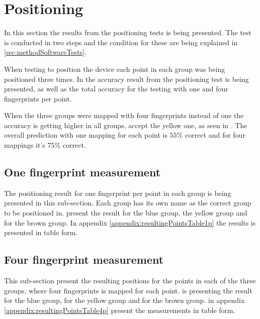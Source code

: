 \section{Positioning}\label{sec:resultPos}
In this section the results from the positioning tests is being presented.
The test is conducted in two steps and the condition for these are being explained in \cref{sec:methodSoftwareTests}.

\bigskip

When testing to position the device each point in each group was being positioned three times.
In  the accuracy result from the positioning test is being presented, as well as the total accuracy for the testing with one and four fingerprints per point.


When the three groups were mapped with four fingerprints instead of one the accuracy is getting higher in all groups, accept the yellow one, as seen in .
The overall prediction with one mapping for each point is $55\%$ correct and for four mappings it's $75\%$ correct.


\subsection{One fingerprint measurement}\label{sec:resultsPosOneFingerprint}
The positioning result for one fingerprint per point in each group is being presented in this sub-section.
Each group has its own name as the correct group to be positioned in.
 present the result for the blue group,  the yellow group and  for the brown group.
In appendix \ref{appendix:resultingPointsTable1p}  the results is presented in table form.





\subsection{Four fingerprint measurement}\label{sec:resultPosFourFingerprints}
This sub-section present the resulting positions for the points in each of the three groups, where four fingerprints is mapped for each point.
 is presenting the result for the blue group,  for the yellow group and  for the brown group. 
 in appendix \ref{appendix:resultingPointsTable4p} present the measurements in table form.

